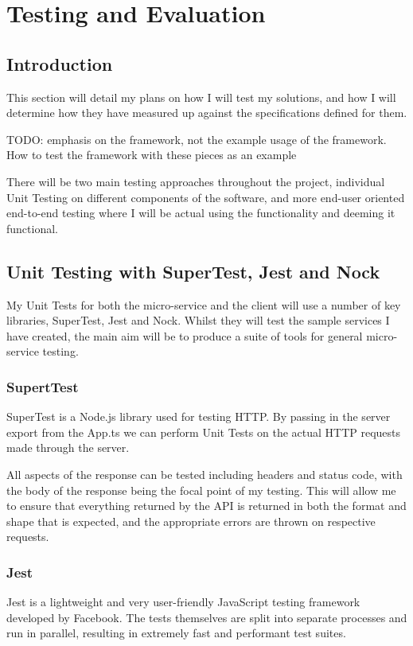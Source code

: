\chapter{Testing and Evaluation}
\section{Introduction}

This section will detail my plans on how I will test my solutions, and how I will determine how they have measured up against the specifications defined for them.

TODO: emphasis on the framework, not the example usage of the framework. How to test the framework with these pieces as an example

There will be two main testing approaches throughout the project, individual Unit Testing on different components of the software, and more end-user oriented end-to-end testing where I will be actual using the functionality and deeming it functional. 
\section{Unit Testing with SuperTest, Jest and Nock}

My Unit Tests for both the micro-service and the client will use a number of key libraries, SuperTest, Jest and Nock. Whilst they will test the sample services I have created, the main aim will be to produce a suite of tools for general micro-service testing.
\subsection{SupertTest}
SuperTest is a Node.js library used for testing HTTP. By passing in the server export from the App.ts we can perform Unit Tests on the actual HTTP requests made through the server.

All aspects of the response can be tested including headers and status code, with the body of the response being the focal point of my testing. This will allow me to ensure that everything returned by the API is returned in both the format and shape that is expected, and the appropriate errors are thrown on respective requests.
\subsection{Jest}
Jest is a lightweight and very user-friendly JavaScript testing framework developed by Facebook. The tests themselves are split into separate processes and run in parallel, resulting in extremely fast and performant test suites.

